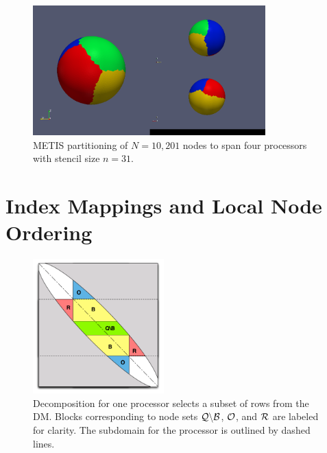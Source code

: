\documentclass{report}
\begin{document}
\begin{figure}[ht!]
\begin{center}
\includegraphics[width=0.8\textwidth]{rbffd_methods_content/decompositions/gpmetis_decomp_sphere_4parts.png}
\caption{METIS partitioning of $N=10,201$ nodes to span four processors with stencil size $n=31$. }
\label{fig:metis_decomposed_sphere}
\end{center}
\end{figure}





\section{Index Mappings and Local Node Ordering}


\begin{figure}[ht!]
\begin{center}
\includegraphics[width=0.45\textwidth]{rbffd_methods_content/decompositions/MatrixDecompositionSets_RBF-FD_Bowed.pdf} 
\caption{Decomposition for one processor selects a subset of rows from the DM. Blocks corresponding to node sets $\mathcal{Q} \backslash \mathcal{B}$, $\mathcal{O}$, and $\mathcal{R}$ are labeled for clarity. The subdomain for the processor is outlined by dashed lines.}
\label{fig:decomp_matrix_view}
\end{center}
\end{figure}
\end{document}

